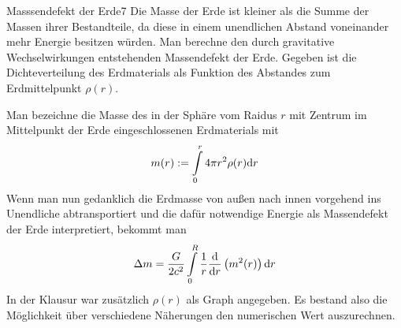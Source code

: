 \begin{problem}{Masssendefekt der Erde}{7}
Die Masse der Erde ist kleiner als die Summe der Massen ihrer Bestandteile, da diese in einem unendlichen Abstand voneinander mehr Energie besitzen würden. Man berechne den durch gravitative Wechselwirkungen entstehenden Massendefekt der Erde. Gegeben ist die Dichteverteilung des Erdmaterials als Funktion des Abstandes zum Erdmittelpunkt $\rho(r)$.

\begin{solution}
Man bezeichne die Masse des in der Sphäre vom Raidus $r$ mit Zentrum im Mittelpunkt der Erde eingeschlossenen Erdmaterials mit
\[
m(r) := \int\limits_0^r 4\pi r^2 \rho(r) \mathrm{d} r
\]
Wenn man nun gedanklich die Erdmasse von außen nach innen vorgehend ins Unendliche abtransportiert und die dafür notwendige Energie als Massendefekt der Erde interpretiert, bekommt man
\[
\Delta m = \frac{G}{2 c^2} \int\limits_{0}^{R} \frac1r \frac{\mathrm{d}}{\mathrm{d} r} \left( m^2(r) \right) \mathrm{d} r
\]
In der Klausur war zusätzlich $\rho(r)$ als Graph angegeben. Es bestand also die Möglichkeit über verschiedene Näherungen den numerischen Wert auszurechnen.
\end{solution}

\end{problem}

